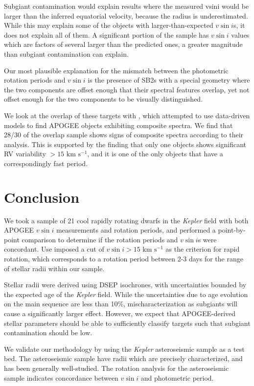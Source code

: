 \documentclass[manuscript]{aastex6}
\newcommand{\vsini}{\ensuremath{v \sin i}}
\newcommand{\Kepler}{\mbox{\textit{Kepler}}}
\newcommand{\kms}{\textrm{ km~s}\ensuremath{^{-1}}}
\begin{document}
Subgiant contamination would explain results where the measured vsini would be
larger than the inferred equatorial velocity, because the radius is
underestimated. While this may explain some of the objects with
larger-than-expected \vsini{}s, it does not explain all of them. A significant
portion of the sample has \vsini{} values which are factors of several larger
than the predicted ones, a greater magnitude than subgiant contamination can 
explain.

Our most plausible explanation for the mismatch between the photometric
rotation periods and \vsini{} is the presence of SB2s with a special geometry
where the two components are offset enough that their spectral features
overlap, yet not offset enough for the two components to be visually
distinguished. 

We look at the overlap of these targets with \citep{ElBadry18}, which attempted
to use data-driven models to find APOGEE objects exhibiting composite spectra. We 
find that 28/30 of the overlap sample shows signs of composite spectra according
to their analysis. This is supported by the finding that only one 
objects shows significant RV variability \(> 15 \kms\), and it is one of
the only objects that have a correspondingly fast period.

\section{Conclusion}
\label{sec:conclusions}

We took a sample of 21 cool rapidly rotating dwarfs in the \Kepler{} field with 
both APOGEE \vsini{} measurements and \citet{McQuillan14} rotation periods, and 
performed a point-by-point comparison to determine if the rotation periods and
\vsini{}s were concordant. Use imposed a cut of \(\vsini > 15 \kms\) as the
criterion for rapid rotation, which corresponds to a rotation period between
2-3 days for the range of stellar radii within our sample.

Stellar radii were derived using DSEP isochrones, with uncertainties bounded by
the expected age of the \Kepler{} field. While the uncertainties due to age
evolution on the main sequence are less than 10\%, mischaracterization as
subgiants will cause a significantly larger effect. However, we expect that
APOGEE-derived stellar parameters should be able to sufficiently classify
targets such that subgiant contamination should be low.

We validate our methodology by using the \Kepler{} asteroseismic sample as a
test bed. The asteroseismic sample have radii which are precisely
characterized, and has been generally well-studied. The rotation analysis for
the asteroseismic sample indicates concordance between \vsini{} and photometric
period.
\end{document}
